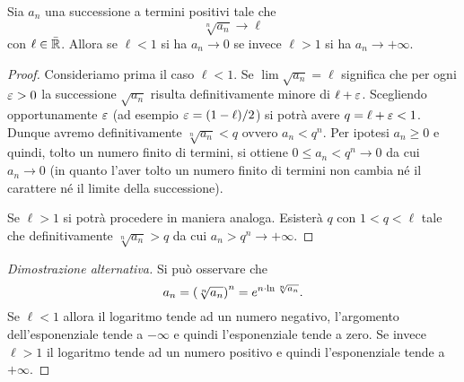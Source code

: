 \begin{theorem}
\label{th:criterio_radice}
\mymark{***}
Sia $a_n$ una successione a termini positivi tale che
\[
  \sqrt[n]{a_n} \to \ell
\]
con $\ell \in \bar {\mathbb R}$.
Allora se $\ell<1$ si ha $a_n \to 0$ se invece $\ell > 1$ si ha $a_n \to +\infty$.
\end{theorem}
%
\begin{proof}
\mymark{**}
Consideriamo prima il caso $\ell < 1$.
Se $\lim \sqrt{a_n} = \ell$ significa che per ogni $\varepsilon>0$ la successione
$\sqrt{a_n}$ risulta definitivamente minore di $\ell +\varepsilon$.
Scegliendo opportunamente $\varepsilon$ (ad esempio $\varepsilon = (1-\ell)/2$) si potrà
avere $q = \ell+\varepsilon < 1$. Dunque avremo definitivamente $\sqrt[n]{a_n}< q$
ovvero $a_n < q^n$. Per ipotesi $a_n\ge 0$
e quindi, tolto un numero finito di termini, si ottiene $0 \le a_n < q^n \to 0$
da cui $a_n \to 0$ (in quanto l'aver tolto un numero finito di termini non
cambia né il carattere né il limite della successione).

Se $\ell>1$ si potrà procedere in maniera analoga. Esisterà $q$ con $1 < q < \ell$ tale che definitivamente $\sqrt[n]{a_n} > q$ da cui $a_n > q^n \to +\infty$.
\end{proof}

\begin{proof}[Dimostrazione alternativa]
  Si può osservare che
  \[
    a_n = {\left( \sqrt[n]{a_n} \right)}^n
     = e^{n \cdot \ln \sqrt[n]{a_n}}.
  \]
  Se $\ell <1$ allora il logaritmo tende ad un numero negativo,
  l'argomento dell'esponenziale tende a $-\infty$ e quindi l'esponenziale tende a zero. Se invece $\ell>1$ il logaritmo tende ad un numero positivo e quindi l'esponenziale tende a $+\infty$.
\end{proof}

